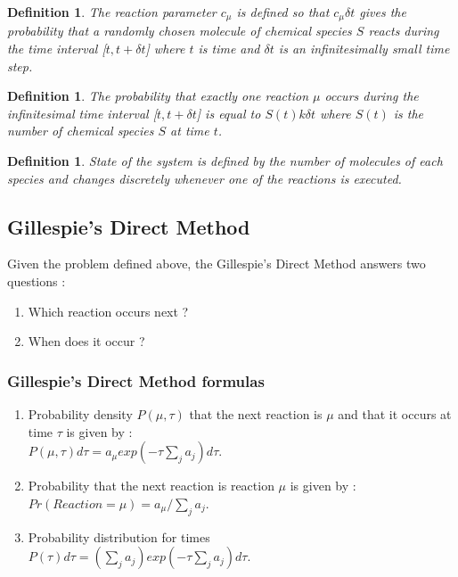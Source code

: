 \documentclass[11pt,a4paper]{article}
\newtheorem{defn}[theorem]{Definition}
\begin{document}
\begin{defn}{}
The reaction parameter $c_{\mu}$ is defined so that $c_{\mu} \delta t$ gives the probability that a randomly chosen molecule of chemical species $S$ reacts during the time interval [$t, t+ \delta t$] where $t$ is time and $\delta t$ is an infinitesimally small time step.
\end{defn}

\begin{defn}{}
The probability that exactly one reaction $\mu$ occurs during the infinitesimal time interval [$t, t+ \delta t$] is equal to $S(t)k \delta t$ where $S(t)$ is the number of chemical species $S$ at time $t$.
\end{defn}

\begin{defn}{}
State of the system is defined by the number of molecules of each species and changes discretely whenever one of the reactions is executed.
\end{defn}

\subsection{Gillespie's Direct Method}
Given the problem defined above, the Gillespie's Direct Method answers two questions :
\begin{enumerate}
  \item Which reaction occurs next ?
  \item When does it occur ?
\end{enumerate}

  \subsubsection{Gillespie's Direct Method formulas}
  \begin{enumerate}
    \item Probability density $P(\mu, \tau)$ that the next reaction is $\mu$ and that it occurs at time $\tau$ is given by : \\ $P(\mu, \tau)d\tau = a_{\mu}exp(-\tau \sum_{j}a_{j})d\tau$. \label{itm:(eq 1)}
    \item Probability that the next reaction is reaction $\mu$ is given by : \\  $Pr(Reaction = \mu) = a_{\mu} / \sum_{j}a_{j}$. \label{itm:(eq 2)}
    \item Probability distribution for times \\  $P(\tau)d\tau = (\sum_{j}a_{j})exp(-\tau \sum_{j}a_{j})d\tau$.\label{itm:(eq 3)}
  \end{enumerate}
\end{document}
